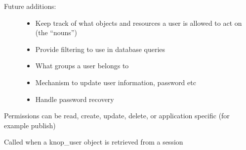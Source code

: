 \documentclass[letterpaper,10pt,english]{sphinxmanual}
\begin{document}
\begin{fulllineitems}
\begin{enumerate}
\begin{itemize}
\end{itemize}

\end{enumerate}
\begin{description}
\item[{Future additions:}] \leavevmode\begin{itemize}
\item {} 
Keep track of what objects and resources a user is allowed to act on (the ``nouns'')

\item {} 
Provide filtering to use in database queries

\item {} 
What groups a user belongs to

\item {} 
Mechanism to update user information, password etc

\item {} 
Handle password recovery

\end{itemize}

\end{description}

Permissions can be read, create, update, delete, or application specific (for example publish)

\begin{fulllineitems}
\label{knop_user:knop_user._unknowntag}
\end{fulllineitems}


\begin{fulllineitems}
\label{knop_user:knop_user.acceptDeserializedElement}
Called when a knop\_user object is retrieved from a session

\end{fulllineitems}


\begin{fulllineitems}
\label{knop_user:knop_user.addlock}
\end{fulllineitems}



\end{fulllineitems}
\end{document}
